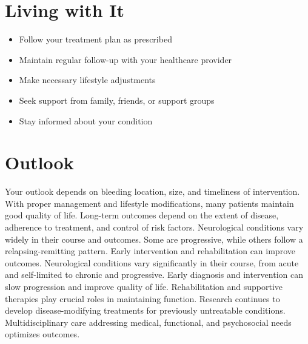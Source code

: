 \section{Living with It}
\begin{itemize}[noitemsep]
  \item Follow your treatment plan as prescribed
  \item Maintain regular follow-up with your healthcare provider
  \item Make necessary lifestyle adjustments
  \item Seek support from family, friends, or support groups
  \item Stay informed about your condition
\end{itemize}
\section{Outlook}
Your outlook depends on bleeding location, size, and timeliness of intervention. With proper management and lifestyle modifications, many patients maintain good quality of life. Long-term outcomes depend on the extent of disease, adherence to treatment, and control of risk factors. Neurological conditions vary widely in their course and outcomes. Some are progressive, while others follow a relapsing-remitting pattern. Early intervention and rehabilitation can improve outcomes. Neurological conditions vary significantly in their course, from acute and self-limited to chronic and progressive. Early diagnosis and intervention can slow progression and improve quality of life. Rehabilitation and supportive therapies play crucial roles in maintaining function. Research continues to develop disease-modifying treatments for previously untreatable conditions. Multidisciplinary care addressing medical, functional, and psychosocial needs optimizes outcomes.
